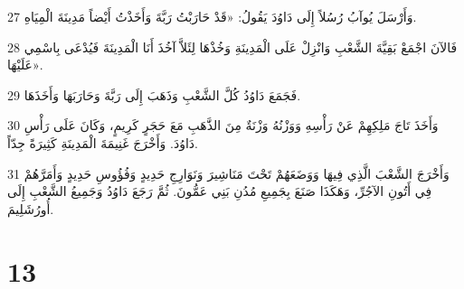 \par 27 وَأَرْسَلَ يُوآبُ رُسُلاً إِلَى دَاوُدَ يَقُولُ: «قَدْ حَارَبْتُ رَبَّةَ وَأَخَذْتُ أَيْضاً مَدِينَةَ الْمِيَاهِ.
\par 28 فَالآنَ اجْمَعْ بَقِيَّةَ الشَّعْبِ وَانْزِلْ عَلَى الْمَدِينَةِ وَخُذْهَا لِئَلاَّ آخُذَ أَنَا الْمَدِينَةَ فَيُدْعَى بِاسْمِي عَلَيْهَا».
\par 29 فَجَمَعَ دَاوُدُ كُلَّ الشَّعْبِ وَذَهَبَ إِلَى رَبَّةَ وَحَارَبَهَا وَأَخَذَهَا.
\par 30 وَأَخَذَ تَاجَ مَلِكِهِمْ عَنْ رَأْسِهِ وَوَزْنُهُ وَزْنَةٌ مِنَ الذَّهَبِ مَعَ حَجَرٍ كَرِيمٍ، وَكَانَ عَلَى رَأْسِ دَاوُدَ. وَأَخْرَجَ غَنِيمَةَ الْمَدِينَةِ كَثِيرَةً جِدّاً.
\par 31 وَأَخْرَجَ الشَّعْبَ الَّذِي فِيهَا وَوَضَعَهُمْ تَحْتَ مَنَاشِيرَ وَنَوَارِجِ حَدِيدٍ وَفُؤُوسِ حَدِيدٍ وَأَمَرَّهُمْ فِي أَتُونِ الآجُرِّ، وَهَكَذَا صَنَعَ بِجَمِيعِ مُدُنِ بَنِي عَمُّونَ. ثُمَّ رَجَعَ دَاوُدُ وَجَمِيعُ الشَّعْبِ إِلَى أُورُشَلِيمَ.

\chapter{13}

